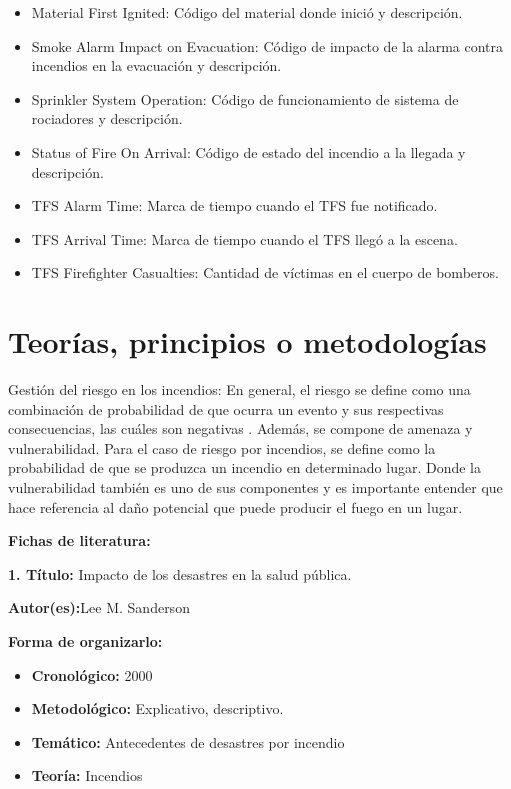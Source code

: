 \documentclass[
  oneside]{memoir}
\begin{document}
\begin{itemize}
\item Material First Ignited: Código del material donde inició y descripción.

\item Smoke Alarm Impact on Evacuation: Código de impacto de la alarma contra incendios en la evacuación y descripción.

\item Sprinkler System Operation: Código de funcionamiento de sistema de rociadores y descripción.

\item Status of Fire On Arrival: Código de estado del incendio a la llegada y descripción.

\item TFS Alarm Time: Marca de tiempo cuando el TFS fue notificado.

\item TFS Arrival Time: Marca de tiempo cuando el TFS llegó a la escena.

\item TFS Firefighter Casualties: Cantidad de víctimas en el cuerpo de bomberos.
\end{itemize}

\section{Teorías, principios o metodologías}

Gestión del riesgo en los incendios: En general, el riesgo se define
como una combinación de probabilidad de que ocurra un evento y sus
respectivas consecuencias, las cuáles son negativas \citep{ciifen}.
Además, se compone de amenaza y vulnerabilidad. Para el caso de riesgo
por incendios, se define como la probabilidad de que se produzca un
incendio en determinado lugar. Donde la vulnerabilidad también es uno de
sus componentes y es importante entender que hace referencia al daño
potencial que puede producir el fuego en un lugar.\citep{cartografia}

\textbf{Fichas de literatura:}

\textbf{ 1. Título:} Impacto de los desastres en la salud pública.

\textbf{Autor(es):}Lee M. Sanderson

\textbf{Forma de organizarlo:}

\begin{itemize}

\item \textbf{Cronológico:} 2000

\item \textbf{Metodológico:} Explicativo, descriptivo.

\item \textbf{Temático:} Antecedentes de desastres por incendio

\item \textbf{Teoría:} Incendios 

\end{itemize}
\end{document}
